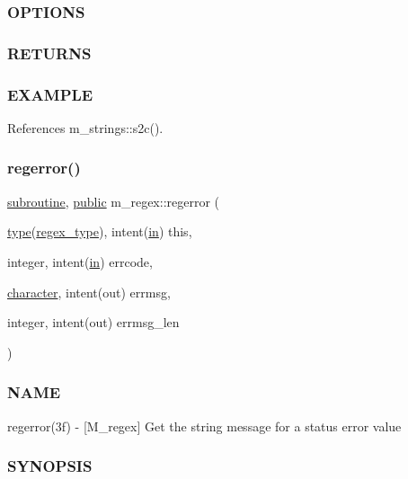 \subsubsection*{O\+P\+T\+I\+O\+NS}

\subsubsection*{R\+E\+T\+U\+R\+NS}

\subsubsection*{E\+X\+A\+M\+P\+LE}

References m\+\_\+strings\+::s2c().

\mbox{\label{namespacem__regex_a7fe6dc1737cbfdf0bb8e1ddca2055a33}} 
\subsubsection{\texorpdfstring{regerror()}{regerror()}}
{\footnotesize\ttfamily \hyperlink{M__stopwatch_83_8txt_acfbcff50169d691ff02d4a123ed70482}{subroutine}, \hyperlink{M__stopwatch_83_8txt_a2f74811300c361e53b430611a7d1769f}{public} m\+\_\+regex\+::regerror (\begin{DoxyParamCaption}\item[{\hyperlink{stop__watch_83_8txt_a70f0ead91c32e25323c03265aa302c1c}{type}(\hyperlink{structm__regex_1_1regex__type}{regex\+\_\+type}), intent(\hyperlink{M__journal_83_8txt_afce72651d1eed785a2132bee863b2f38}{in})}]{this,  }\item[{integer, intent(\hyperlink{M__journal_83_8txt_afce72651d1eed785a2132bee863b2f38}{in})}]{errcode,  }\item[{\hyperlink{option__stopwatch_83_8txt_abd4b21fbbd175834027b5224bfe97e66}{character}, intent(out)}]{errmsg,  }\item[{integer, intent(out)}]{errmsg\+\_\+len }\end{DoxyParamCaption})}



\subsubsection*{N\+A\+ME}

regerror(3f) -\/ \mbox{[}M\+\_\+regex\mbox{]} Get the string message for a status error value \subsubsection*{S\+Y\+N\+O\+P\+S\+IS}

